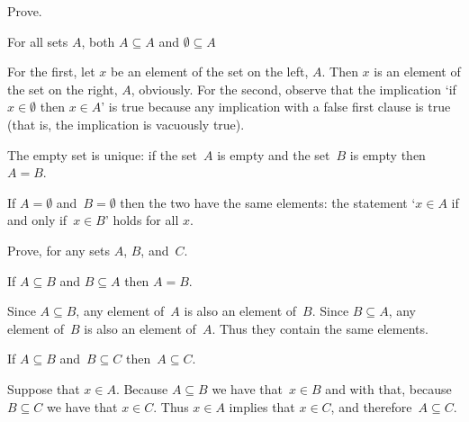 \documentclass{ibl}  %
\begin{document}
\begin{problem} \label{ex:EmptySetUnique}
Prove. 
\begin{exes}
\begin{exercise} 
   For all sets $A$, both $A\subseteq A$ and $\emptyset\subseteq A$
\end{exercise}
\begin{answer}
  For the first, let $x$ be an element of the set on the left, $A$.
  Then $x$ is an element of the set on the right, $A$, obviously.
  For the second, observe that the implication 
  `if $x\in\emptyset$ then $x\in A$' is true 
  because any implication with a false first clause is true
  (that is, the implication is vacuously true).  
\end{answer}
\begin{exercise} 
  The empty set is unique: if the set~$A$ is empty and 
  the set~$B$ is empty then $A=B$.
\end{exercise}
\begin{answer}
  If $A=\emptyset$ and~$B=\emptyset$ then the two have the
  same elements: the statement `$x\in A$ if and only if~$x\in B$' holds   
  for all $x$.
\end{answer}
\end{exes}
\end{problem}

\begin{problem}  \label{ex:PropertiesOfSubset}
Prove, for any sets $A$, $B$, and~$C$.
\begin{exes} 
\begin{exercise} 
  If $A\subseteq B$ and $B\subseteq A$ then $A=B$.
\end{exercise}  
\begin{answer}
   Since $A\subseteq B$, any element of~$A$ is also an element of~$B$.
   Since $B\subseteq A$, any element of~$B$ is also an element of~$A$.
   Thus they contain the same elements.  
\end{answer}
\begin{exercise} 
  If $A\subseteq B$ and~$B\subseteq C$ then~$A\subseteq C$.  
\end{exercise}
\begin{answer}
   Suppose that $x\in A$.
   Because $A\subseteq B$ we have that~$x\in B$ and with that, because
   $B\subseteq C$ we have that $x\in C$.
   Thus $x\in A$ implies that $x\in C$, and therefore~$A\subseteq C$.  
\end{answer}
\end{exes}
\end{problem}
\end{document}

